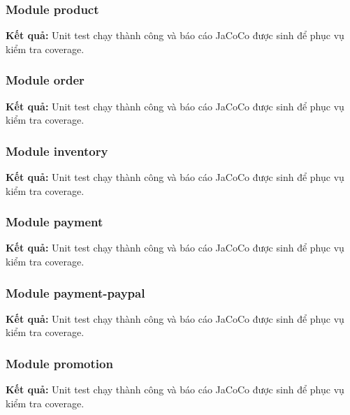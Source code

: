 
\subsubsection{Module product}
\textbf{Kết quả:} Unit test chạy thành công và báo cáo JaCoCo được sinh để phục vụ kiểm tra coverage.


\subsubsection{Module order}
\textbf{Kết quả:} Unit test chạy thành công và báo cáo JaCoCo được sinh để phục vụ kiểm tra coverage.


\subsubsection{Module inventory}
\textbf{Kết quả:} Unit test chạy thành công và báo cáo JaCoCo được sinh để phục vụ kiểm tra coverage.


\subsubsection{Module payment}
\textbf{Kết quả:} Unit test chạy thành công và báo cáo JaCoCo được sinh để phục vụ kiểm tra coverage.


\subsubsection{Module payment-paypal}
\textbf{Kết quả:} Unit test chạy thành công và báo cáo JaCoCo được sinh để phục vụ kiểm tra coverage.


\subsubsection{Module promotion}
\textbf{Kết quả:} Unit test chạy thành công và báo cáo JaCoCo được sinh để phục vụ kiểm tra coverage.

